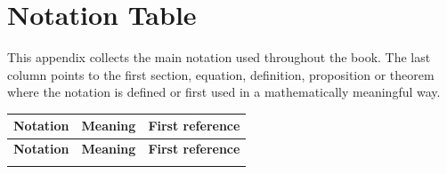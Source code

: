 
\chapter{Notation Table}
\label{app-notation-table}

This appendix collects the main notation used throughout the book. The last
column points to the first section, equation, definition, proposition or theorem
where the notation is defined or first used in a mathematically meaningful way.

{\small
\setlength{\tabcolsep}{4pt}
\renewcommand{\arraystretch}{1.16}
\begin{longtable}{>{\raggedright\arraybackslash}p{}
                  >{\raggedright\arraybackslash}p{}
                  >{\raggedright\arraybackslash}p{}}
\hline
\textbf{Notation} & \textbf{Meaning} & \textbf{First reference} \\
\hline
\endfirsthead
\hline
\textbf{Notation} & \textbf{Meaning} & \textbf{First reference} \\
\hline
\endhead
\hline
\endfoot


\end{longtable}}
